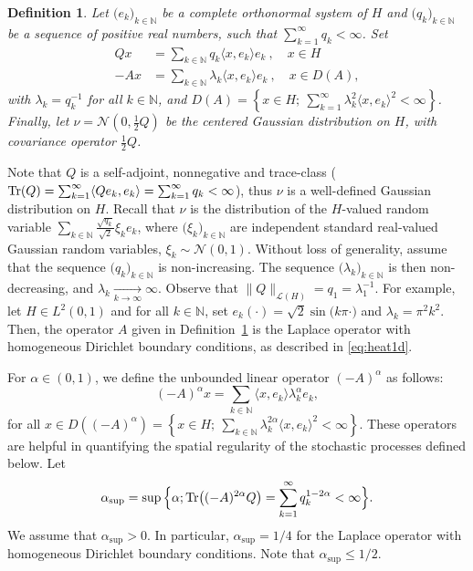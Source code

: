 \documentclass[11pt]{amsart}
\newcommand{\N}{\mathbb{N}}
\newtheorem{defi}[theo]{Definition}
\begin{document}
\begin{defi}\label{defi:QAnu}
Let $\bigl(e_k\bigr)_{k\in\N}$ be a complete orthonormal system of $H$ and $\bigl(q_k\bigr)_{k\in\N}$ be a sequence of positive real numbers, such that $\sum_{k=1}^{\infty}q_k<\infty$.
%
Set
\begin{align*}
Qx&=\sum_{k\in\N}q_k\langle x,e_k\rangle e_k~,\quad x\in H\\
-Ax&=\sum_{k\in\N}\lambda_k\langle x,e_k\rangle e_k~,\quad x\in D(A),
\end{align*}
with $\lambda_k=q_k^{-1}$ for all $k\in\N$, and $D(A)=\left\{x\in H;~\sum_{k=1}^{\infty}\lambda_k^2\langle x,e_k\rangle^2<\infty\right\}$.
%
Finally, let $\nu=\mathcal{N}(0,\frac{1}{2}Q)$ be the centered Gaussian distribution on $H$, with covariance operator $\frac12 Q$.
\end{defi}

Note that $Q$ is a self-adjoint, nonnegative and trace-class (${\rm Tr}(Q)=\sum_{k=1}^{\infty}\langle Qe_k,e_k\rangle=\sum_{k=1}^{\infty}q_k<\infty$), thus $\nu$ is a well-defined Gaussian distribution on $H$. Recall that $\nu$ is the distribution of the $H$-valued random variable $\sum_{k\in\N}\frac{\sqrt{q_k}}{\sqrt{2}}\xi_ke_k$, where $\bigl(\xi_k\bigr)_{k\in\N}$ are independent standard real-valued Gaussian random variables, $\xi_k\sim\mathcal{N}(0,1)$.
%
Without loss of generality, assume that the sequence $\bigl(q_k\bigr)_{k\in\N}$ is non-increasing. The sequence $\bigl(\lambda_k\bigr)_{k\in\N}$ is then non-decreasing, and $\lambda_k\underset{k\to\infty}\to \infty$. Observe that $\|Q\|_{\mathcal{L}(H)}=q_1=\lambda_1^{-1}$.
%
For example, let $H\in L^2(0,1)$ and for all $k\in\N$, set $e_k(\cdot)=\sqrt{2}\sin\bigl(k\pi\cdot)$ and $\lambda_k=\pi^2k^2$. Then, the operator $A$ given in Definition~\ref{defi:QAnu} is the Laplace operator with homogeneous Dirichlet boundary conditions, as described in \eqref{eq:heat1d}.









For $\alpha\in(0,1)$, we define the unbounded linear operator $(-A)^{\alpha}$ as follows:
\[
(-A)^\alpha x=\sum_{k\in\N}\langle x,e_k\rangle \lambda_k^\alpha e_k,
\]
for all $x\in D((-A)^\alpha)=\left\{x\in H;~\sum_{k\in\N}\lambda_k^{2\alpha}\langle x,e_k\rangle^2<\infty\right\}$. These operators are helpful in quantifying the spatial regularity of the stochastic processes defined below.
%
Let
\begin{equation}\label{eq:alphasup}
\alpha_{\sup}=\sup\Big\{\alpha;{\rm Tr}\bigl((-A)^{2\alpha}Q\bigr)=\sum_{k=1}^{\infty} q_k^{1-2\alpha}<\infty\Big\}.
\end{equation}
We assume that $\alpha_{\sup}>0$.
In particular, $\alpha_{\sup}=1/4$ for the Laplace operator with homogeneous Dirichlet boundary conditions. Note that $\alpha_{\sup}\leq 1/2$.
\end{document}
